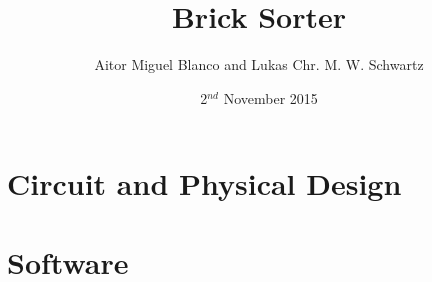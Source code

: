 \documentclass[12pt,a4paper]{article}
\begin{document}
\title{Brick Sorter}
\date{2$^{nd}$ November 2015}
\author{Aitor Miguel Blanco and Lukas Chr. M. W. Schwartz}
\maketitle

\pagebreak

\tableofcontents

\pagebreak




\section{Circuit and Physical Design}






\section{Software}






\end{document}
